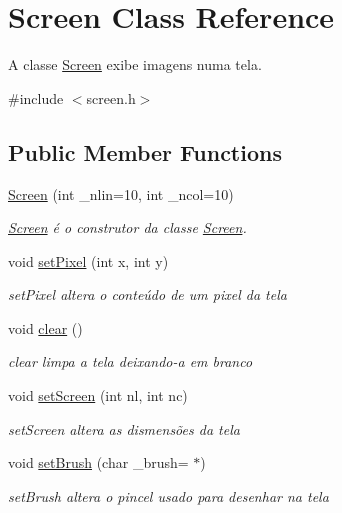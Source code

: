 \hypertarget{class_screen}{}\section{Screen Class Reference}
\label{class_screen}


A classe \hyperlink{class_screen}{Screen} exibe imagens numa tela.  




{\ttfamily \#include $<$screen.\+h$>$}

\subsection*{Public Member Functions}
\begin{DoxyCompactItemize}
\item 
\hyperlink{class_screen_a95aff497d133f685fbbb959d78dc0899}{Screen} (int \+\_\+nlin=10, int \+\_\+ncol=10)
\begin{DoxyCompactList}\small\item\em \hyperlink{class_screen}{Screen} é o construtor da classe \hyperlink{class_screen}{Screen}. \end{DoxyCompactList}\item 
void \hyperlink{class_screen_ae6bea81c57a22d226507c3c26fa95ee0}{set\+Pixel} (int x, int y)
\begin{DoxyCompactList}\small\item\em set\+Pixel altera o conteúdo de um pixel da tela \end{DoxyCompactList}\item 
void \hyperlink{class_screen_a35e74266b2a04e37b354ceff7a5f1031}{clear} ()
\begin{DoxyCompactList}\small\item\em clear limpa a tela deixando-\/a em branco \end{DoxyCompactList}\item 
void \hyperlink{class_screen_a59f2c3f9e889b425940749e8f646db72}{set\+Screen} (int nl, int nc)
\begin{DoxyCompactList}\small\item\em set\+Screen altera as dismensões da tela \end{DoxyCompactList}\item 
void \hyperlink{class_screen_aad52e3e6f35fe32f185cd70550a0a305}{set\+Brush} (char \+\_\+brush= \textquotesingle{}$\ast$\textquotesingle{})
\begin{DoxyCompactList}\small\item\em set\+Brush altera o pincel usado para desenhar na tela \end{DoxyCompactList}\end{DoxyCompactItemize}

